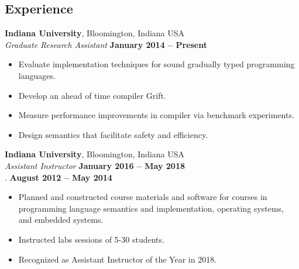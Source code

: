 \documentclass[resmargin,line]{res}
\newenvironment{list1}{
  \begin{list}{\ding{113}}{%
      \setlength{\itemsep}{0in}
      \setlength{\parsep}{0in} \setlength{\parskip}{0in}
      \setlength{\topsep}{0in} \setlength{\partopsep}{0in} 
      \setlength{\leftmargin}{0.17in}}}{\end{list}}
\begin{document}
\begin{resume}


\section{\sc Experience}
{\bf Indiana University}, Bloomington, Indiana USA\\
{\em Graduate Research Assistant} \hfill {\bf January 2014 -- Present}\\
%
\begin{itemize}
\vspace*{-.3cm}
\item Evaluate implementation techniques for sound gradually typed
  programming languages.
\item Develop an ahead of time compiler Grift.
\item Measure performance improvements in compiler via benchmark experiments.
\item Design semantics that facilitate safety and efficiency.
\end{itemize}

{\bf Indiana University}, Bloomington, Indiana USA\\
{\em Assistant Instructor} \hfill {\bf January 2016 -- May 2018}\\
{\color{white} . } \quad \hfill {\bf August 2012 -- May 2014}\\
%
\begin{itemize}
\vspace*{-.35cm}
\item Planned and constructed course materials and software for
  courses in programming language semantics and implementation,
  operating systems, and embedded systems.
\item Instructed labs sessions of 5-30 students.
\item Recognized as Assistant Instructor of the Year in 2018.
\end{itemize}
%



\end{resume}
\end{document}
